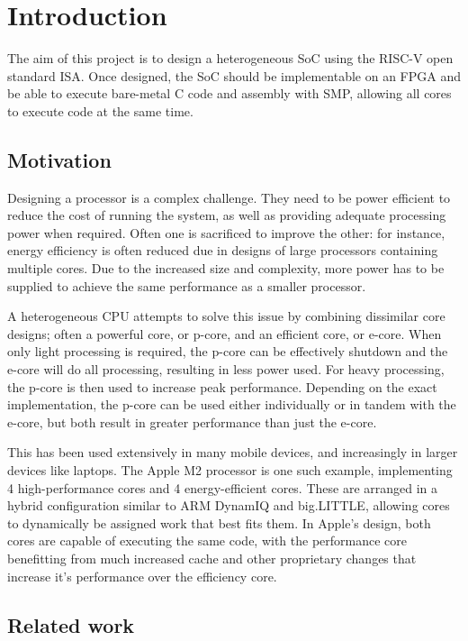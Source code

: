 \section{Introduction}
The aim of this project is to design a heterogeneous SoC using the RISC-V open standard ISA. Once designed, the SoC should be implementable on an FPGA and be able to execute bare-metal C code and assembly with SMP, allowing all cores to execute code at the same time.

\subsection{Motivation}
Designing a processor is a complex challenge. They need to be power efficient to reduce the cost of running the system, as well as providing adequate processing power when required. Often one is sacrificed to improve the other: for instance, energy efficiency is often reduced due in designs of large processors containing multiple cores. Due to the increased size and complexity, more power has to be supplied to achieve the same performance as a smaller processor.

A heterogeneous CPU attempts to solve this issue by combining dissimilar core designs; often a powerful core, or p-core, and an efficient core, or e-core. When only light processing is required, the p-core can be effectively shutdown and the e-core will do all processing, resulting in less power used. For heavy processing, the p-core is then used to increase peak performance. Depending on the exact implementation, the p-core can be used either individually or in tandem with the e-core, but both result in greater performance than just the e-core.

This has been used extensively in many mobile devices, and increasingly in larger devices like laptops. The Apple M2 processor\cite{} is one such example, implementing 4 high-performance cores and 4 energy-efficient cores. These are arranged in a hybrid configuration similar to ARM DynamIQ and big.LITTLE\cite{biglittle}, allowing cores to dynamically be assigned work that best fits them. In Apple's design, both cores are capable of executing the same code, with the performance core benefitting from much increased cache and other proprietary changes that increase it's performance over the efficiency core. 

\subsection{Related work}
